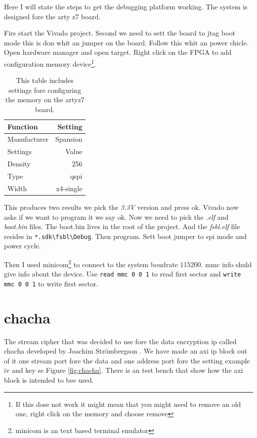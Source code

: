 \documentclass[]{article}
\begin{document}
Here I will state the steps to get the debugging platform working.
The system is designed fore the arty z7 board.

Firs start the Vivado project.
Second we need to sett the board to jtag boot mode this is don whit an jumper on the board.
Follow this whit an power chicle.
Open hardware manager and open target.
Right click on the FPGA to add configuration memory device\footnote{If this dose not work it might mean that you might need to remove an old one, right click on the memory and choose remove}.
\begin{table}
	\centering
	\begin{tabular}{l|r}
		Function		& Setting		\\
		\hline
		Manufacturer	& Spansion  	\\ 
		Settings 		& Value  		\\ 
		Density  		& 256  			\\ 
		Type 			& qspi  		\\ 
		Width 			& x4-single  	
	\end{tabular}
	\caption{This table includes settings fore configuring the memory on the artyz7 board.}
	\label{table:memorySettings}
\end{table}

This produces two results we pick the \emph{3.3V} version and press ok.
Vivado now asks if we want to program it we say ok.
Now we need to pick the \emph{.elf} and \emph{boot.bin} files.
The boot.bin lives in the root of the project. 
And the \emph{fsbl.elf} file resides in \texttt{*.sdk\textbackslash fsbl\textbackslash Debug}.
Then program.
Sett boot jumper to spi mode and power cycle.

Then I used minicom\footnote{minicom is an text based terminal emulator} to connect to the system boudrate 115200.
mmc info shuld give info about the device.
Use \texttt{read mmc 0 0 1} to read first sector and \texttt{write mmc 0 0 1} to write first sector.


\section{chacha}
The stream cipher that was decided to use fore the data encryption ip called chacha \cite{chacha} developed by Joachim Strömbergson \cite{joachim}.  
We have made an axi ip block out of it one stream port fore the data and one address port fore the setting example iv and key se Figure \ref{fig:chacha}.
There is an test bench that show how the axi block is intended to bee used.
\end{document}

